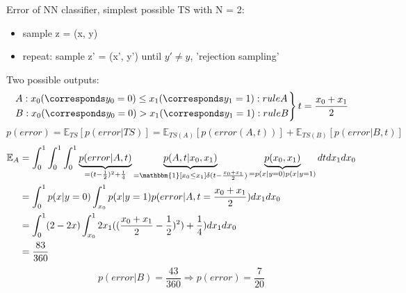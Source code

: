 \documentclass[11pt]{article}
\begin{document}
          Error of NN classifier, simplest possible TS with N = 2:
          \begin{itemize}
            \item sample z = (x, y)
            \item repeat: sample z' = (x', y') until $y'\neq y$, 'rejection sampling'
          \end{itemize}
          Two possible outputs:
          \begin{equation*}
            \begin{rcases*}
              A: x_{0}(\corresponds y_{0} = 0) \leq x_{1} (\corresponds y_{1} = 1): rule A \\
              B: x_{0}(\corresponds y_{0} = 0) > x_{1} (\corresponds y_{1} = 1): rule B
            \end{rcases*}
            t = \frac{x_{0} + x_{1}}{2}
          \end{equation*}
          \begin{equation*}
            p(error) = \mathbb{E}_{TS}[p(error|TS)] = \mathbb{E}_{TS(A)}[p(error(A,t))] +
            \mathbb{E}_{TS(B)}[p(error|B, t)]
          \end{equation*}
          \begin{equation*}
            \begin{align}
            \mathbb{E}_{A} &= \int_{0}^{1} \int_{0}^{1} \int_{0}^{1} \underbrace{p(error|A, t)}_{
            = (t-\frac{1}{2})^2+\frac{1}{4}}\underbrace{p(A, t|x_{0}, x_{1})}_{
            = \mathbbm{1}[x_{0} \leq x_{1}]\delta(t-\frac{x_{0}+x_{1}}{2})}
            \underbrace{p(x_{0}, x_{1})}_{=p(x|y=0)p(x|y=1)}dt dx_{1} dx_{0} \\
            &= \int_{0}^{1} p(x|y=0) \int_{x_{0}}^{1} p(x|y=1)p(error|A,t=\frac{x_{0}+x_{1}}{2})
            dx_{1} dx_{0} \\
            &= \int_{0}^{1} (2-2x) \int_{x_{0}}^{1} 2 x_{1}((\frac{x_{0}+x_{1}}{2} - \frac{1}{2})^2)
            + \frac{1}{4})dx_{1} dx_{0} \\
            &= \frac{83}{360}
          \end{align}
          \end{equation*}
          \begin{equation*}
            p(error|B) = \frac{43}{360} \Rightarrow p(error) = \frac{7}{20}
          \end{equation*}
\end{document}
